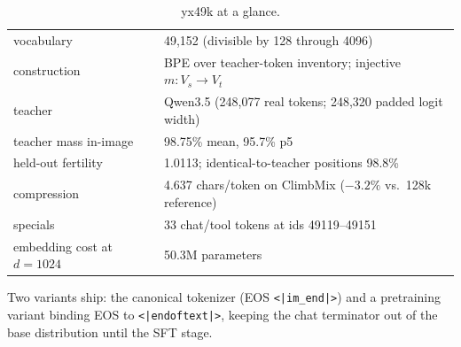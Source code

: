 \begin{table}[h]
\centering
\small
\caption{yx49k at a glance.}
\label{tab:tokenizer}
\begin{tabular}{ll}
\toprule
vocabulary & 49{,}152 (divisible by 128 through 4096) \\
construction & BPE over teacher-token inventory; injective $m: V_s \to V_t$ \\
teacher & Qwen3.5 (248{,}077 real tokens; 248{,}320 padded logit width) \\
teacher mass in-image & 98.75\% mean, 95.7\% p5 \\
held-out fertility & 1.0113; identical-to-teacher positions 98.8\% \\
compression & 4.637 chars/token on ClimbMix ($-3.2\%$ vs.\ 128k reference) \\
specials & 33 chat/tool tokens at ids 49119--49151 \\
embedding cost at $d{=}1024$ & 50.3M parameters \\
\bottomrule
\end{tabular}
\end{table}

Two variants ship: the canonical tokenizer (EOS \texttt{<|im\_end|>})
and a pretraining variant binding EOS to \texttt{<|endoftext|>}, keeping
the chat terminator out of the base distribution until the SFT stage.
